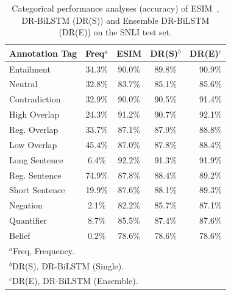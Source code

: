 \documentclass[11pt,a4paper]{article}
\begin{document}
	
	\begin{table}[t]
		\centering
		\small
		\begin{tabular}{lcccr}
			\hline
			Annotation Tag & Freq$^a$ & ESIM & DR(S)$^b$ & DR(E)$^c$ \\
			\hline \hline
			Entailment & 34.3\% & 90.0\% & 89.8\% & 90.9\% \\
			Neutral & 32.8\% & 83.7\% & 85.1\% & 85.6\% \\
			Contradiction & 32.9\% & 90.0\% & 90.5\% & 91.4\% \\ \hline
			High Overlap & 24.3\% & 91.2\% & 90.7\% & 92.1\% \\
			Reg. Overlap & 33.7\% & 87.1\% & 87.9\% & 88.8\% \\
			Low Overlap & 45.4\% & 87.0\% & 87.8\% & 88.4\% \\ \hline
			Long Sentence & 6.4\%  & 92.2\% & 91.3\% & 91.9\% \\
			Reg. Sentence & 74.9\% & 87.8\% & 88.4\% & 89.2\% \\
			Short Sentence & 19.9\% & 87.6\% & 88.1\% & 89.3\% \\ \hline
			Negation & 2.1\% & 82.2\% & 85.7\% & 87.1\% \\
			Quantifier & 8.7\% & 85.5\% & 87.4\% & 87.6\% \\
			Belief & 0.2\% & 78.6\% & 78.6\% & 78.6\% \\
			\hline \hline
			\multicolumn{5}{l}{$^a$Freq, Frequency.} \\
			\multicolumn{5}{l}{$^b$DR(S), DR-BiLSTM (Single).} \\
			\multicolumn{5}{l}{$^c$DR(E), DR-BiLSTM (Ensemble).} \\ \hline
		\end{tabular}
		\caption{\label{tab:snli:deep:analz} Categorical performance analyses (accuracy) of ESIM~\cite{him2017}, DR-BiLSTM (DR(S)) and Ensemble DR-BiLSTM (DR(E)) on the SNLI test set.}
	\end{table}	
	
\end{document}
